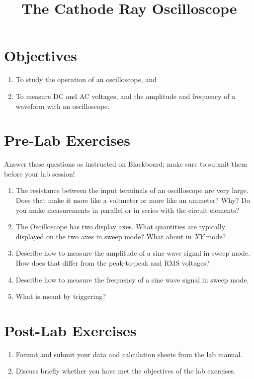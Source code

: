 \documentclass[12pt]{article}
\title{The Cathode Ray Oscilloscope}
\author{}
\date{}
\begin{document}
\maketitle

\section{Objectives}
\label{sec:objectives}

\begin{enumerate}
\item To study the operation of an oscilloscope, and
\item To measure DC and AC voltages, and the amplitude and frequency
  of a waveform with an oscilloscope.
\end{enumerate}


\section*{Pre-Lab Exercises}

Answer these questions as instructed on Blackboard; make sure to
submit them before your lab session!

\begin{enumerate}
\item The resistance between the input terminals of an oscilloscope
  are very large.  Does that make it more like a voltmeter or more
  like an ammeter?  Why?  Do you make measurements in parallel or in
  series with the circuit elements?
\item The Oscilloscope has two display axes.  What quantities are
  typically displayed on the two axes in sweep mode?  What about in
  $XY$ mode?
\item Describe how to measure the amplitude of a sine wave signal in
  sweep mode.  How does that differ from the peak-to-peak and RMS
  voltages? 
\item Describe how to measure the frequency of a sine wave signal in
  sweep mode.
\item What is meant by triggering?
\end{enumerate}

\newpage

\section*{Post-Lab Exercises}

\begin{enumerate}
\item Format and submit your data and calculation sheets from the lab
  manual.
\item Discuss briefly whether you have met the objectives of the lab
  exercises. 
\end{enumerate}
\end{document}
